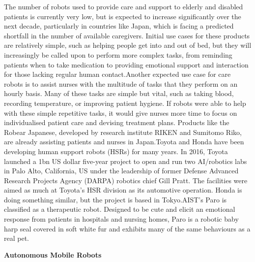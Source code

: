 \documentclass[12pt,a4paper]{report}
\begin{document}
The number of robots used to provide care and support to elderly and disabled patients is currently very low, but is expected to increase significantly over the next decade, particularly in countries like Japan, which is facing a predicted shortfall in the number of available caregivers. Initial use cases for these products are relatively simple, such as helping people get into and out of bed, but they will increasingly be called upon to perform more complex tasks, from reminding patients when to take medication to providing emotional support and interaction for those lacking regular human contact.Another expected use case for care robots is to assist nurses with the multitude of tasks that they perform on an hourly basis. Many of these tasks are simple but vital, such as taking blood, recording temperature, or improving patient hygiene. If robots were able to help with these simple repetitive tasks, it would give nurses more time to focus on individualised patient care and devising treatment plans. Products like the Robear Japanese, developed by research institute RIKEN and Sumitomo Riko, are already assisting patients and nurses in Japan.Toyota and Honda have been developing human support robots (HSRs) for many years. In 2016, Toyota launched a 1bn US dollar five-year project to open and run two AI/robotics labs in Palo Alto, California, US under the leadership of former Defense Advanced Research Projects Agency (DARPA) robotics chief Gill Pratt. The facilities were aimed as much at Toyota’s HSR division as its automotive operation. Honda is doing something similar, but the project is based in Tokyo.AIST’s Paro is classified as a therapeutic robot. Designed to be cute and elicit an emotional response from patients in hospitals and nursing homes, Paro is a robotic baby harp seal covered in soft white fur and exhibits many of the same behaviours as a real pet.

\begin{center}
  \small{\textbf{Autonomous Mobile Robots}}
\end{center}
\end{document}
